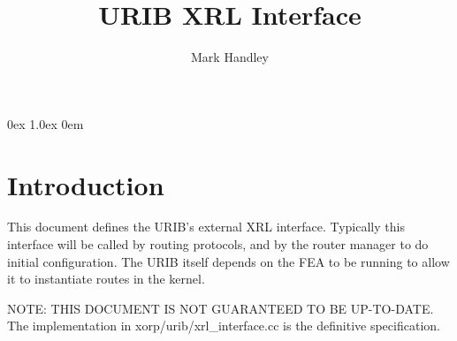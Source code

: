 \documentclass[11pt]{article}
\date{}
\title{URIB XRL Interface}
\author{Mark Handley}
\begin{document}
\parsep 0ex
\parskip 1.0ex
\parindent 0em
\noindent
\maketitle                            
\section{Introduction}
This document defines the URIB's external XRL interface.  Typically
this interface will be called by routing protocols, and by the router
manager to do initial configuration.  The URIB itself depends on the
FEA to be running to allow it to instantiate routes in the kernel.

NOTE: THIS DOCUMENT IS NOT GUARANTEED TO BE UP-TO-DATE.  
\newline
The
implementation in xorp/urib/xrl\_interface.cc is the definitive
specification.  
\end{document}
